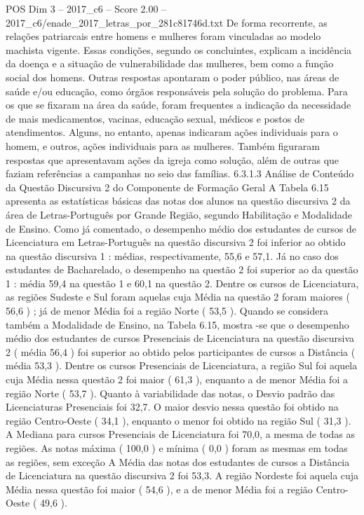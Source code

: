 \begin{textsample}{POS Dim 3 – 2017\_c6 – Score 2.00 – 2017\_c6/enade\_2017\_letras\_por\_281c81746d.txt}
De forma recorrente, as relações patriarcais entre homens e mulheres foram vinculadas ao modelo machista vigente.
Essas condições, segundo os concluintes, explicam a incidência da doença e a situação de vulnerabilidade das mulheres, bem como a função social dos homens.
Outras respostas apontaram o poder público, nas áreas de saúde e/ou educação, como órgãos responsáveis pela solução do problema.
Para os que se fixaram na área da saúde, foram frequentes a indicação da necessidade de mais medicamentos, vacinas, educação sexual, médicos e postos de atendimentos.
Alguns, no entanto, apenas indicaram ações individuais para o homem, e outros, ações individuais para as mulheres.
Também figuraram respostas que apresentavam ações da igreja como solução, além de outras que faziam referências a campanhas no seio das famílias. 6.3.1.3 Análise de Conteúdo da Questão Discursiva 2 do Componente de Formação Geral A Tabela 6.15 apresenta as estatísticas básicas das notas dos alunos na questão discursiva 2 da área de Letras-Português por Grande Região, segundo Habilitação e Modalidade de Ensino.
Como já comentado, o desempenho médio dos estudantes de cursos de Licenciatura em Letras-Português na questão discursiva 2 foi inferior ao obtido na questão discursiva 1 : médias, respectivamente, 55,6 e 57,1.
Já no caso dos estudantes de Bacharelado, o desempenho na questão 2 foi superior ao da questão 1 : média 59,4 na questão 1 e 60,1 na questão 2.
Dentre os cursos de Licenciatura, as regiões Sudeste e Sul foram aquelas cuja Média na questão 2 foram maiores ( 56,6 ) ; já de menor Média foi a região Norte ( 53,5 ).
Quando se considera também a Modalidade de Ensino, na Tabela 6.15, mostra -se que o desempenho médio dos estudantes de cursos Presenciais de Licenciatura na questão discursiva 2 ( média 56,4 ) foi superior ao obtido pelos participantes de cursos a Distância ( média 53,3 ).
Dentre os cursos Presenciais de Licenciatura, a região Sul foi aquela cuja Média nessa questão 2 foi maior ( 61,3 ), enquanto a de menor Média foi a região Norte ( 53,7 ).
Quanto à variabilidade das notas, o Desvio padrão das Licenciaturas Presenciais foi 32,7.
O maior desvio nessa questão foi obtido na região Centro-Oeste ( 34,1 ), enquanto o menor foi obtido na região Sul ( 31,3 ).
A Mediana para cursos Presenciais de Licenciatura foi 70,0, a mesma de todas as regiões.
As notas máxima ( 100,0 ) e mínima ( 0,0 ) foram as mesmas em todas as regiões, sem exceção A Média das notas dos estudantes de cursos a Distância de Licenciatura na questão discursiva 2 foi 53,3.
A região Nordeste foi aquela cuja Média nessa questão foi maior ( 54,6 ), e a de menor Média foi a região Centro-Oeste ( 49,6 ).

\end{textsample}
